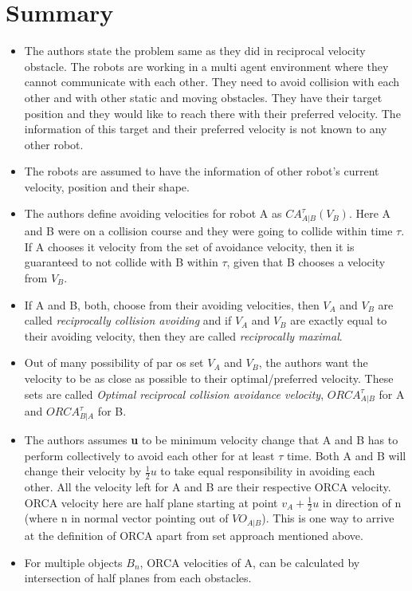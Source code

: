\documentclass[12pt]{article}
\begin{document}
\section{Summary}
\begin{itemize}
    \item The authors state the problem same as they did in reciprocal velocity obstacle\cite{van2008reciprocal}. The robots are working in a multi agent environment where they cannot communicate with each other. They need to avoid collision with each other and with other static and moving obstacles. They have their target position and they would like to reach there with their preferred velocity. The information of this target and their preferred velocity is not known to any other robot.
    \item The robots are assumed to have the information of other robot's current velocity, position and their shape.
    \item The authors define avoiding velocities for robot A as $CA_{A|B}^{\tau} (V_B)$. Here A and B were on a collision course and they were going to collide within time $\tau$. If A chooses it velocity from the set of avoidance velocity, then it is guaranteed to not collide with B within $\tau$, given that B chooses a velocity from $V_B$. 
    \item If A and B, both, choose from their avoiding velocities, then $V_A$ and $V_B$ are called \textit{reciprocally collision avoiding} and if $V_A$ and $V_B$ are exactly equal to their avoiding velocity, then they are called \textit{reciprocally maximal}.
    \item Out of many possibility of par os set $V_A$ and $V_B$, the authors want the velocity to be as close as possible to their optimal/preferred velocity. These sets are called \textit{Optimal reciprocal collision avoidance velocity}, $ORCA_{A|B}^{\tau}$ for A and $ORCA_{B|A}^{\tau}$ for B.
    \item The authors assumes \textbf{u} to be minimum velocity change that A and B has to perform collectively to avoid each other for at least $\tau$ time. Both A and B will change their velocity by $\frac{1}{2}u$ to take equal responsibility in avoiding each other. All the  velocity left for A and B are their respective ORCA velocity. ORCA velocity here are half plane starting at point $v_A + \frac{1}{2}u$ in direction of n (where n in normal vector pointing out of $VO_{A|B}$). This is one way to arrive at the definition of ORCA apart from set approach mentioned above.
    \item For multiple objects $B_n$, ORCA velocities of A, can be calculated by intersection of half planes from each obstacles.

\end{itemize}
\end{document}
